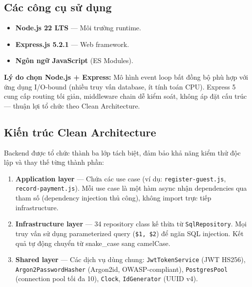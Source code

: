 \subsection{Các công cụ sử dụng}
\begin{itemize}
    \item \textbf{Node.js 22 LTS} — Môi trường runtime.
    \item \textbf{Express.js 5.2.1} — Web framework.
    \item \textbf{Ngôn ngữ JavaScript} (ES Modules).
\end{itemize}
\textbf{Lý do chọn Node.js + Express:} Mô hình event loop bất đồng bộ phù hợp với ứng dụng I/O-bound (nhiều truy vấn database, ít tính toán CPU). Express 5 cung cấp routing tối giản, middleware chain dễ kiểm soát, không áp đặt cấu trúc — thuận lợi tổ chức theo Clean Architecture.

\subsection{Kiến trúc Clean Architecture}
Backend được tổ chức thành ba lớp tách biệt, đảm bảo khả năng kiểm thử độc lập và thay thế từng thành phần:
\begin{enumerate}
    \item \textbf{Application layer} — Chứa các use case (ví dụ: \texttt{register-guest.js}, \texttt{record-payment.js}). Mỗi use case là một hàm async nhận dependencies qua tham số (dependency injection thủ công), không import trực tiếp infrastructure.
    \item \textbf{Infrastructure layer} — 34 repository class kế thừa từ \texttt{SqlRepository}. Mọi truy vấn sử dụng parameterized query (\texttt{\$1, \$2}) để ngăn SQL injection. Kết quả tự động chuyển từ snake\_case sang camelCase.
    \item \textbf{Shared layer} — Các dịch vụ dùng chung: \texttt{JwtTokenService} (JWT HS256), \texttt{Argon2PasswordHasher} (Argon2id, OWASP-compliant), \texttt{PostgresPool} (connection pool tối đa 10), \texttt{Clock}, \texttt{IdGenerator} (UUID v4).
\end{enumerate}

